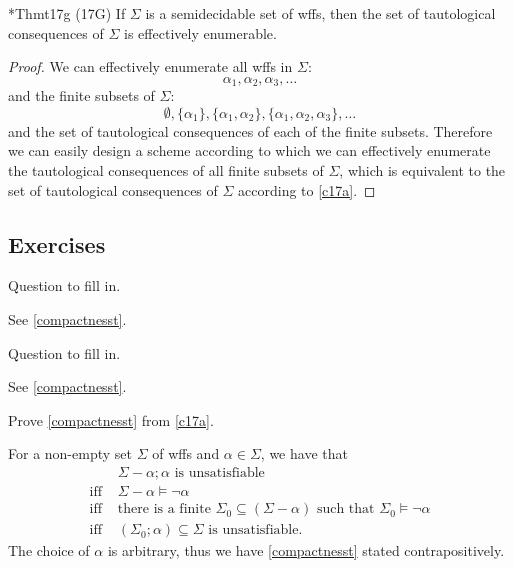 \begin{reference}{*Thm}{t17g}
  (17G) If $\Sigma$ is a semidecidable set of wffs, then the set of tautological consequences of $\Sigma$ is effectively enumerable.
\end{reference}

\begin{proof}
  We can effectively enumerate all wffs in $\Sigma$:
  \[
    \alpha_1,\alpha_2,\alpha_3,\dots
  \]
  and the finite subsets of $\Sigma$:
  \[
    \emptyset,\{\alpha_1\},\{\alpha_1,\alpha_2\},\{\alpha_1,\alpha_2,\alpha_3\},\dots
  \]
  and the set of tautological consequences of each of the finite subsets. Therefore we can easily design a scheme according to which we can effectively enumerate the tautological consequences of all finite subsets of $\Sigma$, which is equivalent to the set of tautological consequences of $\Sigma$ according to \ref{c17a}.
\end{proof}

\subsection*{Exercises}

\begin{exercise}
  Question to fill in.
\end{exercise}

See \ref{compactnesst}.

\begin{exercise}
  Question to fill in.
\end{exercise}

See \ref{compactnesst}.

\begin{exercise}
  Prove \ref{compactnesst} from \ref{c17a}.
\end{exercise}

For a non-empty set $\Sigma$ of wffs and $\alpha\in \Sigma$, we have that
\begin{align*}
              & \Sigma-\alpha;\alpha\text{ is unsatisfiable}                                                        \\
  \text{iff } & \Sigma-\alpha\vDash\neg\alpha                                                                       \\
  \text{iff } & \text{there is a finite }\Sigma_0\subseteq(\Sigma-\alpha)\text{ such that }\Sigma_0\vDash\neg\alpha \\
  \text{iff } & (\Sigma_0;\alpha)\subseteq \Sigma\text{ is unsatisfiable}.
\end{align*}
The choice of $\alpha$ is arbitrary, thus we have \ref{compactnesst} stated contrapositively.

